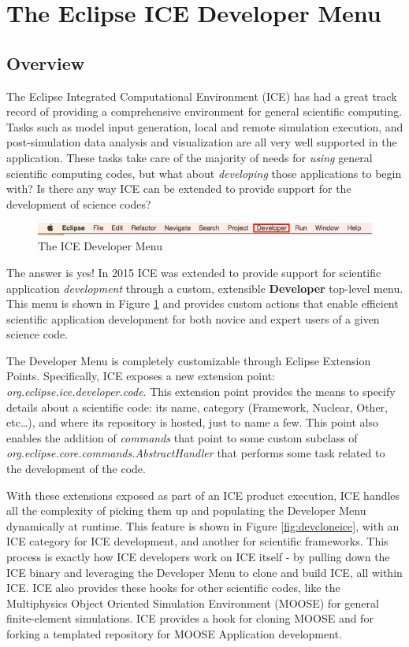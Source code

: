 \documentclass{article}
\begin{document}
\section*{The Eclipse ICE Developer Menu}

\subsection*{Overview}
The Eclipse Integrated Computational Environment (ICE) has had a great track
record of providing a comprehensive environment for general scientific
computing. Tasks such as model input generation, local and remote simulation
execution, and post-simulation data analysis and visualization are all very well
supported in the application. These tasks take care of the majority of needs
for \emph{using} general scientific computing codes, but what about
\emph{developing} those applications to begin with? Is there any way ICE can be
extended to provide support for the development of science codes?

\begin{figure}[h]
\includegraphics[width=\textwidth]{figures/icemenu.png}
\centering
\caption{The ICE Developer Menu}
\label{fig:devmenu}
\end{figure}

The answer is yes! In 2015 ICE was extended to provide support for scientific
application \emph{development} through a custom, extensible \textbf{Developer} 
top-level menu. This menu is shown in Figure
\ref{fig:devmenu} and provides custom actions that enable efficient scientific
application development for both novice and expert users of a given science
code.

The Developer Menu is completely customizable through Eclipse Extension Points.
Specifically, ICE exposes a new extension point:
\emph{org.eclipse.ice.developer.code}. This extension point provides the means
to specify details about a scientific code: its name, category (Framework,
Nuclear, Other, etc\ldots), and where its repository is hosted, just to name a
few. This point also enables the addition of \emph{commands} that point to some
custom subclass of \emph{org.eclipse.core.commands.AbstractHandler} that
performs some task related to the development of the code.

With these extensions exposed as part of an ICE product execution, ICE
handles all the complexity of picking them up and populating the Developer Menu
dynamically at runtime. This feature is shown in Figure \ref{fig:devcloneice},
with an ICE category for ICE development, and another for scientific frameworks.
This process is exactly how ICE developers work on ICE itself - by pulling down
the ICE binary and leveraging the Developer Menu to clone and build ICE, all
within ICE. ICE also provides these hooks for other scientific codes, like the
Multiphysics Object Oriented Simulation Environment (MOOSE) for general
finite-element simulations. ICE provides a hook for cloning MOOSE and for
forking a templated repository for MOOSE Application development.
\end{document}
